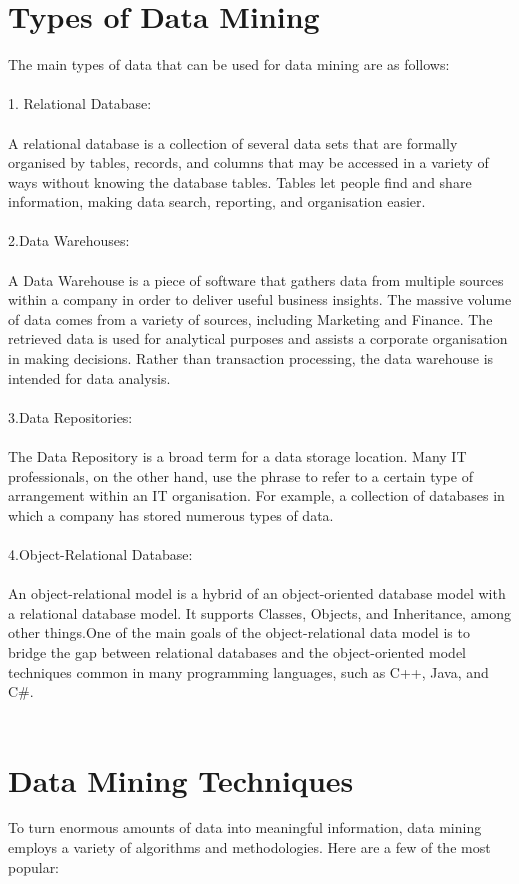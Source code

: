 \documentclass[12pt,letterpaper]{article}
\begin{document}
\section{Types of Data Mining}
The main types of data that can be used for data mining are as follows:\\
\\
1. Relational Database:\\
\\
A relational database is a collection of several data sets that are formally organised by tables, records, and columns that may be accessed in a variety of ways without knowing the database tables. Tables let people find and share information, making data search, reporting, and organisation easier.\\
\\
2.Data Warehouses:\\
\\
A Data Warehouse is a piece of software that gathers data from multiple sources within a company in order to deliver useful business insights. The massive volume of data comes from a variety of sources, including Marketing and Finance. The retrieved data is used for analytical purposes and assists a corporate organisation in making decisions. Rather than transaction processing, the data warehouse is intended for data analysis.\\
\\
3.Data Repositories:\\
\\
The Data Repository is a broad term for a data storage location. Many IT professionals, on the other hand, use the phrase to refer to a certain type of arrangement within an IT organisation. For example, a collection of databases in which a company has stored numerous types of data.\\
\\
4.Object-Relational Database:\\
\\
An object-relational model is a hybrid of an object-oriented database model with a relational database model. It supports Classes, Objects, and Inheritance, among other things.One of the main goals of the object-relational data model is to bridge the gap between relational databases and the object-oriented model techniques common in many programming languages, such as C++, Java, and C#.\\
\\
\section{Data Mining Techniques}
To turn enormous amounts of data into meaningful information, data mining employs a variety of algorithms and methodologies. Here are a few of the most popular:
\end{document}
